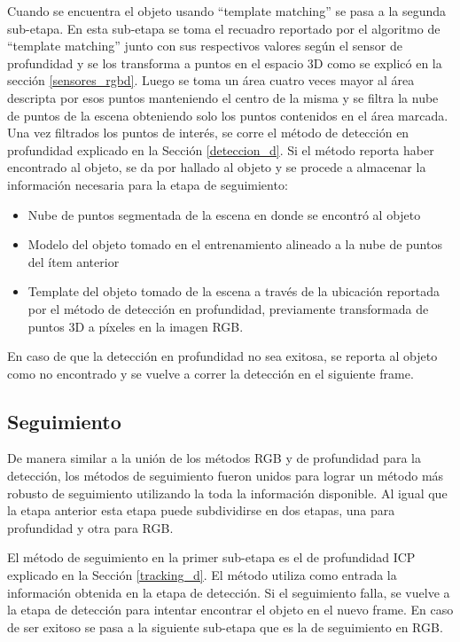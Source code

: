 Cuando se encuentra el objeto usando ``template matching'' se pasa a la segunda sub-etapa. En esta sub-etapa se toma el recuadro reportado por el algoritmo de ``template matching'' junto con sus respectivos valores según el sensor de profundidad y se los transforma a puntos en el espacio 3D como se explicó en la sección \ref{sensores_rgbd}. Luego se toma un área cuatro veces mayor al área descripta por esos puntos manteniendo el centro de la misma y se filtra la nube de puntos de la escena obteniendo solo los puntos contenidos en el área marcada. Una vez filtrados los puntos de interés, se corre el método de detección en profundidad explicado en la Sección \ref{deteccion_d}. Si el método reporta haber encontrado al objeto, se da por hallado al objeto y se procede a almacenar la información necesaria para la etapa de seguimiento:
\begin{itemize}
	\item Nube de puntos segmentada de la escena en donde se encontró al objeto
	\item Modelo del objeto tomado en el entrenamiento alineado a la nube de puntos del ítem anterior
	\item Template del objeto tomado de la escena a través de la ubicación reportada por el método de detección en profundidad, previamente transformada de puntos 3D a píxeles en la imagen RGB.
\end{itemize}

En caso de que la detección en profundidad no sea exitosa, se reporta al objeto como no encontrado y se vuelve a correr la detección en el siguiente frame.


\subsection{Seguimiento}\label{tracking_rgbd}
De manera similar a la unión de los métodos RGB y de profundidad para la detección, los métodos de seguimiento fueron unidos para lograr un método más robusto de seguimiento utilizando la toda la información disponible. Al igual que la etapa anterior esta etapa puede subdividirse en dos etapas, una para profundidad y otra para RGB.

El método de seguimiento en la primer sub-etapa es el de profundidad ICP explicado en la Sección \ref{tracking_d}. El método utiliza como entrada la información obtenida en la etapa de detección. Si el seguimiento falla, se vuelve a la etapa de detección para intentar encontrar el objeto en el nuevo frame. En caso de ser exitoso se pasa a la siguiente sub-etapa que es la de seguimiento en RGB.

